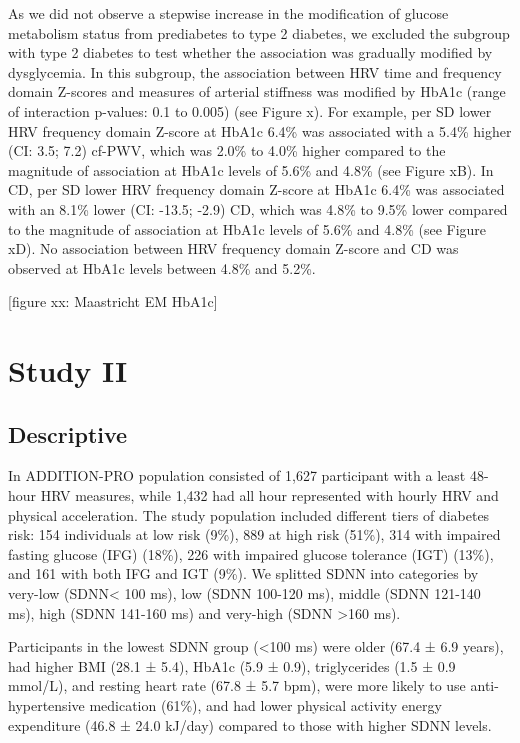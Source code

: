 \documentclass[
  a4paper,
  headsepline=true,
  open=any]{scrbook}
\begin{document}
As we did not observe a stepwise increase in the modification of glucose
metabolism status from prediabetes to type 2 diabetes, we excluded the
subgroup with type 2 diabetes to test whether the association was
gradually modified by dysglycemia. In this subgroup, the association
between HRV time and frequency domain Z-scores and measures of arterial
stiffness was modified by HbA1c (range of interaction p-values: 0.1 to
0.005) (see Figure x). For example, per SD lower HRV frequency domain
Z-score at HbA1c 6.4\% was associated with a 5.4\% higher (CI: 3.5; 7.2)
cf-PWV, which was 2.0\% to 4.0\% higher compared to the magnitude of
association at HbA1c levels of 5.6\% and 4.8\% (see Figure xB). In CD,
per SD lower HRV frequency domain Z-score at HbA1c 6.4\% was associated
with an 8.1\% lower (CI: -13.5; -2.9) CD, which was 4.8\% to 9.5\% lower
compared to the magnitude of association at HbA1c levels of 5.6\% and
4.8\% (see Figure xD). No association between HRV frequency domain
Z-score and CD was observed at HbA1c levels between 4.8\% and 5.2\%.

{[}figure xx: Maastricht EM HbA1c{]}

\hypertarget{study-ii-1}{%
\section{Study II}\label{study-ii-1}}

\hypertarget{descriptive-1}{%
\subsection{Descriptive}\label{descriptive-1}}

In ADDITION-PRO population consisted of 1,627 participant with a least
48-hour HRV measures, while 1,432 had all hour represented with hourly
HRV and physical acceleration. The study population included different
tiers of diabetes risk: 154 individuals at low risk (9\%), 889 at high
risk (51\%), 314 with impaired fasting glucose (IFG) (18\%), 226 with
impaired glucose tolerance (IGT) (13\%), and 161 with both IFG and IGT
(9\%). We splitted SDNN into categories by very-low (SDNN\textless{} 100
ms), low (SDNN 100-120 ms), middle (SDNN 121-140 ms), high (SDNN 141-160
ms) and very-high (SDNN \textgreater160 ms).

Participants in the lowest SDNN group (\textless100 ms) were older (67.4
± 6.9 years), had higher BMI (28.1 ± 5.4), HbA1c (5.9 ± 0.9),
triglycerides (1.5 ± 0.9 mmol/L), and resting heart rate (67.8 ± 5.7
bpm), were more likely to use anti-hypertensive medication (61\%), and
had lower physical activity energy expenditure (46.8 ± 24.0 kJ/day)
compared to those with higher SDNN levels.
\end{document}
